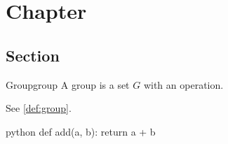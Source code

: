 \documentclass[outputdir=build,chapterstyle=en]{Hypo-Note}
\begin{document}
\makecover
\tableofcontents

\chapter{Chapter}
\section{Section}

\begin{definition}{Group}{group}
A group is a set $G$ with an operation.
\end{definition}
See \cref{def:group}.

\begin{hypocode}[linenos=false]{python}
def add(a, b):
    return a + b
\end{hypocode}
\end{document}
